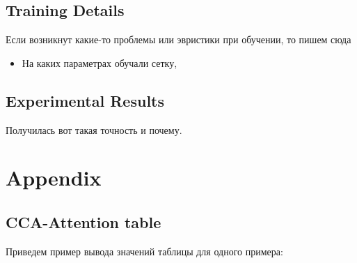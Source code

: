 \documentclass[a4paper,14pt]{article}
\theoremstyle{plain} %
\theoremstyle{definition} %
\theoremstyle{remark} %
\begin{document}
        \subsection{Training Details}
        Если возникнут какие-то проблемы или эвристики при обучении, то пишем сюда
        \begin{itemize}
            \item На каких параметрах обучали сетку, 
        \end{itemize}

        \subsection{Experimental Results}
        Получилась вот такая точность и почему.

        \section{Appendix}
        \subsection{CCA-Attention table}
        Приведем пример вывода значений таблицы для одного примера:
	\nocite{*}
        
	
\end{document}
